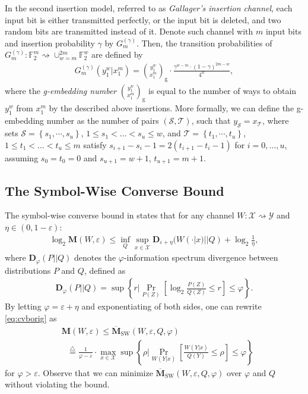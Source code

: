 \documentclass[journal, twocol]{IEEEtran}
\newcommand{\gbinom}[2]{{\binom{#1}{#2}_{\!\text{g}}}}
\newcommand{\bfD}{{\mathbf{D}}}
\newcommand{\bF}{{\mathbb{F}}}
\newcommand{\bfM}{{\mathbf{M}}}
\newcommand{\obfM}{{\overline{\mathbf{M}}}}
\newcommand{\mS}{{\mathcal{S}}}
\newcommand{\mT}{{\mathcal{T}}}
\newcommand{\mX}{{\mathcal{X}}}
\newcommand{\mY}{{\mathcal{Y}}}
\newcommand{\set}[1]{{\left\{{#1}\right\}}}
\newcommand{\brsq}[1]{{\left[{#1}\right]}}
\newcommand{\defeq}{{\overset{\triangle}{=}}}
\newcommand{\ve}{\varepsilon}
\newcommand{\vp}{\varphi}
\newcommand{\tosq}{\rightsquigarrow}
\begin{document}
In the second insertion model, referred to as \emph{Gallager's insertion channel}, each input bit is either transmitted perfectly, or the input bit is deleted, and two random bits are transmitted instead of it.
Denote such channel with $m$ input bits and insertion probability $\gamma$ by $G_m^{(\gamma)}$.
Then, the transition probabilities of $G_m^{(\gamma)}:\bF_2^m\tosq \cup_{w=m}^{2m} \bF_2^w$ are defined by
\begin{align}
G^{(\gamma)}_m(y_1^w|x_1^m)=\gbinom{y_1^w}{x_1^m} \cdot \frac{\gamma^{w-m} \cdot (1-\gamma)^{2m-w}}{4^w},
\label{eq:gc}
\end{align}
where the \emph{g-embedding number} $\gbinom{y_1^w}{x_1^m}$ is equal to the number of ways to obtain $y_1^w$ from $x_1^m$ by the described above insertions.
More formally, we can define the g-embedding number as the number of pairs $(\mS,\mT)$, such that $y_\mS=x_\mT$, where sets $\mS=\set{s_1,\cdots,s_u}$, $1\leq s_1 < \dots <s_u\leq w$, and $\mT=\set{t_1,\cdots,t_u}$, $1\leq t_1 < \dots <t_u\leq m$ satisfy $s_{i+1}-s_i-1=2(t_{i+1}-t_i-1)$ for $i=0,\dots,u$, assuming $s_0=t_0=0$ and $s_{u+1}=w+1$, $t_{u+1}=m+1$.


\subsection{The Symbol-Wise Converse Bound}

The symbol-wise converse bound in  \cite[Prop 4.4]{tan15asymptotic} states that for any channel $W:\mX\tosq\mY$ and $\eta\in(0,1-\ve)$:
\begin{align}
\log_2\bfM(W,\ve) \leq \inf_{Q} \sup_{x\in\mX} \bfD_{\ve+\eta}(W(\cdot|x)||Q)+\log_2\frac{1}{\eta},
\label{eq:cvborig}
\end{align}
where $\bfD_{\vp}(P||Q)$ denotes the $\vp$-information spectrum divergence between distributions $P$ and $Q$, defined as
\begin{align}
\bfD_{\vp}(P||Q)= \sup\set{r \bigg| \Pr_{P(Z)}\brsq{\log_2\frac{P(Z)}{Q(Z)}\leq r}\leq \vp}.
\label{eq:dse}
\end{align}
By letting $\vp=\ve+\eta$ and exponentiating of both sides, one can rewrite \eqref{eq:cvborig} as
\begin{align}
&\bfM(W,\ve) \leq \obfM_{\text{SW}}(W,\ve,Q,\vp)
\nonumber \\&
\ \ \ \defeq \frac{1}{\vp - \ve} \cdot \max_{x\in\mX} \sup \set{\rho\bigg| \Pr_{W(Y|x)}\brsq{\frac{W(Y|x)}{Q(Y)}\leq \rho} \leq \vp}
\label{eq:cvb}
\end{align}
for $\vp > \ve$.
Observe that we can minimize $\obfM_{\text{SW}}(W,\ve,Q,\vp)$ over $\vp$ and $Q$ without violating the bound.
\end{document}
